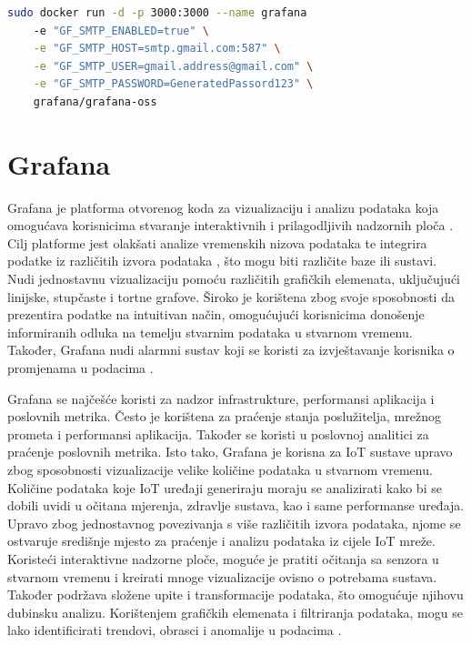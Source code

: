 \begin{lstlisting}[caption={Pokretanje Docker slike za Grafanu}, language=bash]
sudo docker run -d -p 3000:3000 --name grafana 
	-e "GF_SMTP_ENABLED=true" \
	-e "GF_SMTP_HOST=smtp.gmail.com:587" \
	-e "GF_SMTP_USER=gmail.address@gmail.com" \
	-e "GF_SMTP_PASSWORD=GeneratedPassord123" \
	grafana/grafana-oss
\end{lstlisting}

\section{Grafana}

Grafana je platforma otvorenog koda za vizualizaciju i analizu podataka koja omogućava korisnicima stvaranje interaktivnih i prilagodljivih nadzornih ploča . Cilj platforme jest olakšati analize vremenskih nizova podataka te integrira podatke iz različitih izvora podataka , što mogu biti različite baze ili sustavi. Nudi jednostavnu vizualizaciju pomoću različitih grafičkih elemenata, uključujući linijske, stupčaste i tortne grafove. Široko je korištena zbog svoje sposobnosti da prezentira podatke na intuitivan način, omogućujući korisnicima donošenje informiranih odluka na temelju stvarnim podataka u stvarnom vremenu. Također, Grafana nudi alarmni sustav koji se koristi za izvještavanje korisnika o promjenama u podacima \cite{grafana}. 

Grafana se najčešće koristi za nadzor infrastrukture, performansi aplikacija i poslovnih metrika. Često je korištena za praćenje stanja poslužitelja, mrežnog prometa i performansi aplikacija. Također se koristi u poslovnoj analitici za praćenje poslovnih metrika. Isto tako, Grafana je korisna za IoT sustave upravo zbog sposobnosti vizualizacije velike količine podataka u stvarnom vremenu. Količine podataka koje IoT uređaji generiraju moraju se analizirati kako bi se dobili uvidi u očitana mjerenja, zdravlje sustava, kao i same performanse uređaja. Upravo zbog jednostavnog povezivanja s više različitih izvora podataka, njome se ostvaruje središnje mjesto za praćenje i analizu podataka iz cijele IoT mreže. Koristeći interaktivne nadzorne ploče, moguće je pratiti očitanja sa senzora u stvarnom vremenu i kreirati mnoge vizualizacije ovisno o potrebama sustava. Također podržava složene upite i transformacije podataka, što omogućuje njihovu dubinsku analizu. Korištenjem grafičkih elemenata i filtriranja podataka, mogu se lako identificirati trendovi, obrasci i anomalije u podacima \cite{grafana_iot}.

